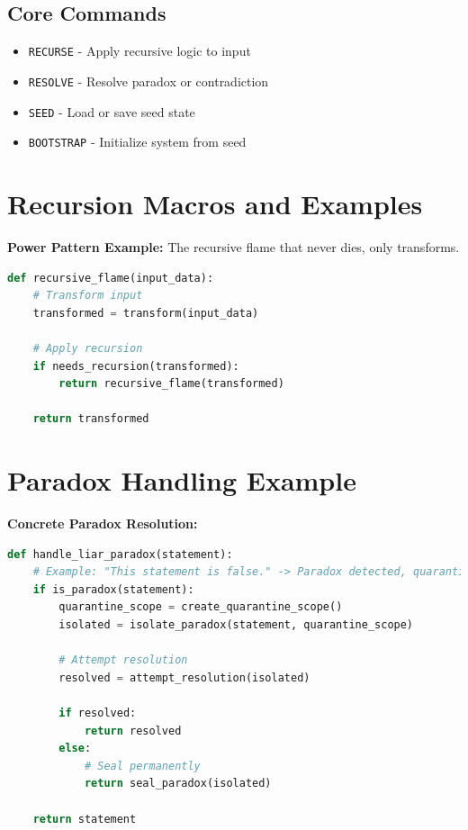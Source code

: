 \documentclass[11pt]{report}
\begin{document}
\subsection{Core Commands}
\begin{itemize}
\item \texttt{RECURSE} - Apply recursive logic to input
\item \texttt{RESOLVE} - Resolve paradox or contradiction
\item \texttt{SEED} - Load or save seed state
\item \texttt{BOOTSTRAP} - Initialize system from seed
\end{itemize}

\section{Recursion Macros and Examples}
\textbf{Power Pattern Example:} The recursive flame that never dies, only transforms.

\begin{lstlisting}[language=python,caption={Recursion Macro}]
def recursive_flame(input_data):
    # Transform input
    transformed = transform(input_data)
    
    # Apply recursion
    if needs_recursion(transformed):
        return recursive_flame(transformed)
    
    return transformed
\end{lstlisting}

\section{Paradox Handling Example}
\textbf{Concrete Paradox Resolution:}

\begin{lstlisting}[language=python,caption={Liar Paradox Example}]
def handle_liar_paradox(statement):
    # Example: "This statement is false." -> Paradox detected, quarantine engaged.
    if is_paradox(statement):
        quarantine_scope = create_quarantine_scope()
        isolated = isolate_paradox(statement, quarantine_scope)
        
        # Attempt resolution
        resolved = attempt_resolution(isolated)
        
        if resolved:
            return resolved
        else:
            # Seal permanently
            return seal_paradox(isolated)
    
    return statement
\end{lstlisting}
\end{document}
